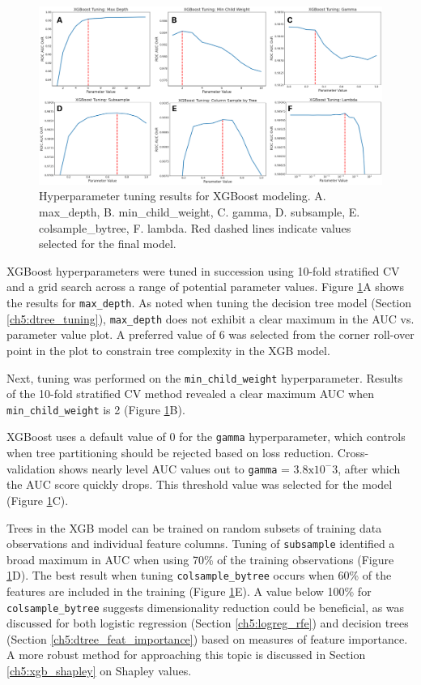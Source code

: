 \begin{figure}[!htp]
\centering
\includegraphics[width=\textwidth]{templates/images/Figure-XGB_Hyperparameters.png}
\caption[XGBoost hyperparameter tuning]{Hyperparameter tuning results for XGBoost modeling. A. max\_depth, B. min\_child\_weight, C. gamma, D. subsample, E. colsample\_bytree, F. lambda. Red dashed lines indicate values selected for the final model.}
\label{fig:xgb_hyperparam}
\end{figure}

XGBoost hyperparameters were tuned in succession using 10-fold stratified CV and a grid search across a range of potential parameter values. Figure \ref{fig:xgb_hyperparam}A shows the results for \verb|max_depth|. As noted when tuning the decision tree model (Section \ref{ch5:dtree_tuning}), \verb|max_depth| does not exhibit a clear maximum in the AUC vs. parameter value plot. A preferred value of 6 was selected from the corner roll-over point in the plot to constrain tree complexity in the XGB model.

Next, tuning was performed on the \verb|min_child_weight| hyperparameter. Results of the 10-fold stratified CV method revealed a clear maximum AUC when \verb|min_child_weight| is 2 (Figure \ref{fig:xgb_hyperparam}B).

XGBoost uses a default value of 0 for the \verb|gamma| hyperparameter, which controls when tree partitioning should be rejected based on loss reduction. Cross-validation shows nearly level AUC values out to \verb|gamma| = $3.8 \text{x} 10^-3$, after which the AUC score quickly drops. This threshold value was selected for the model (Figure \ref{fig:xgb_hyperparam}C).

Trees in the XGB model can be trained on random subsets of training data observations and individual feature columns. Tuning of \verb|subsample| identified a broad maximum in AUC when using 70\% of the training observations (Figure \ref{fig:xgb_hyperparam}D). The best result when tuning \verb|colsample_bytree| occurs when 60\% of the features are included in the training  (Figure \ref{fig:xgb_hyperparam}E). A value below 100\% for \verb|colsample_bytree| suggests dimensionality reduction could be beneficial, as was discussed for both logistic regression (Section \ref{ch5:logreg_rfe}) and decision trees (Section \ref{ch5:dtree_feat_importance}) based on measures of feature importance. A more robust method for approaching this topic is discussed in Section \ref{ch5:xgb_shapley} on Shapley values.

